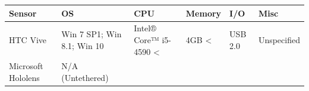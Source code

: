 \documentclass[12pt]{article}
\begin{document}
\begin{longtable}[]{@{}llllll@{}}
\toprule
\begin{minipage}[b]{0.14\columnwidth}\raggedright\strut
Sensor\strut
\end{minipage} & \begin{minipage}[b]{0.18\columnwidth}\raggedright\strut
OS\strut
\end{minipage} & \begin{minipage}[b]{0.20\columnwidth}\raggedright\strut
CPU\strut
\end{minipage} & \begin{minipage}[b]{0.10\columnwidth}\raggedright\strut
Memory\strut
\end{minipage} & \begin{minipage}[b]{0.10\columnwidth}\raggedright\strut
I/O\strut
\end{minipage} & \begin{minipage}[b]{0.11\columnwidth}\raggedright\strut
Misc\strut
\end{minipage}\tabularnewline
\midrule
\endhead
\begin{minipage}[t]{0.14\columnwidth}\raggedright\strut
HTC Vive\strut
\end{minipage} & \begin{minipage}[t]{0.18\columnwidth}\raggedright\strut
Win 7 SP1; Win 8.1; Win 10\strut
\end{minipage} & \begin{minipage}[t]{0.20\columnwidth}\raggedright\strut
Intel® Core™ i5-4590 \textless{}\strut
\end{minipage} & \begin{minipage}[t]{0.10\columnwidth}\raggedright\strut
4GB \textless{}\strut
\end{minipage} & \begin{minipage}[t]{0.10\columnwidth}\raggedright\strut
USB 2.0\strut
\end{minipage} & \begin{minipage}[t]{0.11\columnwidth}\raggedright\strut
Unspecified\strut
\end{minipage}\tabularnewline
\begin{minipage}[t]{0.14\columnwidth}\raggedright\strut
Microsoft Hololens\strut
\end{minipage} & \begin{minipage}[t]{0.18\columnwidth}\raggedright\strut
N/A (Untethered)\strut
\end{minipage} & \begin{minipage}[t]{0.20\columnwidth}\raggedright\strut

\end{minipage}
\end{longtable}
\end{document}
